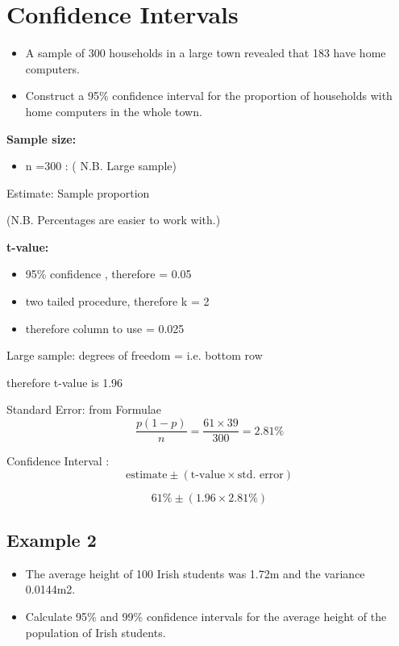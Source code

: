 \documentclass[12pt, a4paper]{report}
\author{ } \date{ }
\theoremstyle{definition}
\theoremstyle{remark}
\begin{document}
\section{Confidence Intervals}

\begin{itemize}
	\item A sample of 300 households in a large town revealed that 183 have home computers.
	\item Construct a 95\% confidence interval for the proportion of households with home computers in the whole town.
\end{itemize}

 
\textbf{Sample size:}       
\begin{itemize}
	\item n =300 :  ( N.B. Large sample)
\end{itemize}  
 
Estimate:             Sample proportion   
 
    (N.B. Percentages are easier to work with.)
 
\textbf{t-value:}           

\begin{itemize}
\item 95\% confidence , therefore  = 0.05
\item two tailed procedure, therefore k = 2
\item therefore column to use = 0.025
\end{itemize}
 
                      Large sample:  degrees of freedom =  i.e. bottom row
 
                      therefore t-value is 1.96                   
 
 
Standard Error:  from Formulae   
\[  \frac{p(1-p)}{n}      = \frac{61 \times 39}{300}        = 2.81\%\]
 
 
Confidence Interval : 
\[\mbox{estimate} \pm (\mbox{t-value} \times \mbox{std. error})\]
 
\[  61\% \pm (1.96 \times 2.81\%) \]
 


\newpage


\subsection{Example 2}

\begin{itemize}
\item The average height of 100 Irish students was 1.72m and the variance 0.0144m2.
\item 
Calculate 95\% and 99\% confidence intervals for the average height of the population of Irish students.
\end{itemize}
\end{document}
